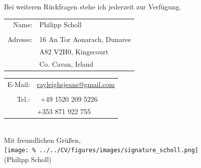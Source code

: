 \documentclass[
  fontsize=11pt,
  paper=a4,
]{report}
\begin{document}
%
    Bei weiteren Rückfragen stehe ich jederzeit zur Verfügung.\\[.5cm]%
%
    \begin{minipage}{.47\textwidth}
        \begin{center}
            \def\arraystretch{1}%
            \begin{tabular}{rl}%
              Name: & Philipp Scholl \\
              & \\%
              Adresse: & %
                  16 An Tor Aonarach, Dunaree\\%
                  & A82 V2H0, Kingscourt\\%
                  & Co. Cavan, Irland%
            \end{tabular}
        \end{center}
    \end{minipage}
    \hfill%
    \begin{minipage}{.47\textwidth}
        \begin{center}
            \def\arraystretch{1}%
            \begin{tabular}{rl}%
              E-Mail: & \href{mailto:rayleighsjeans@gmail.com}{rayleighsjeans@gmail.com} \\%
              & \\%
              Tel.: & %
                  \,\,\,+49 1520 209 5226\\%
                  & +353 871 922 755%
            \end{tabular}
        \end{center}
    \end{minipage}
    \\[0.5cm]%
%
    Mit freundlichen Grüßen,\\[.5cm]%
    \texttt{[image: \%
      ../../CV/figures/images/signature\_scholl.png]}\\[-0.5cm]%
    (Philipp Scholl)%
%
\end{document}

